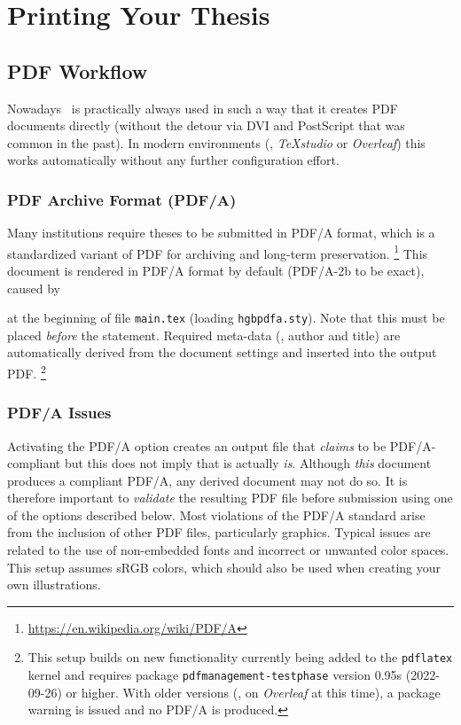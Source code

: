 \chapter{Printing Your Thesis}
\label{cha:Printing}


\section{PDF Workflow}
\label{sec:pdf-workflow}

Nowadays \latex\ is practically always used in such a way that it creates PDF
documents directly (without the detour via DVI and PostScript that was common
in the past). In modern environments (\eg, \emph{TeXstudio} or \emph{Overleaf})
this works automatically without any further configuration effort.


\subsection{PDF Archive Format (PDF/A)}
\label{sec:PDFA}

Many institutions require theses to be submitted in PDF/A format, which is a
standardized variant of PDF for archiving and long-term preservation.%
\footnote{\url{https://en.wikipedia.org/wiki/PDF/A}}
This document is rendered in PDF/A format by default (PDF/A-2b to be exact),
caused by
%
\begin{LaTeXCode}[numbers=none]
\RequirePackage{hgbpdfa}
\end{LaTeXCode}
%
at the beginning of file \verb!main.tex! (loading \verb!hgbpdfa.sty!).
Note that this must be placed \emph{before} the \verb!!
statement. Required meta-data (\eg, author and title) are automatically 
derived from the document settings and inserted into the output PDF.%
\footnote{This setup builds on new functionality currently being added to
the \texttt{pdflatex} kernel and requires package \texttt{pdfmanagement-testphase}
version 0.95s (2022-09-26) or higher. With older versions (\eg, on \emph{Overleaf}
at this time), a package warning is issued and no PDF/A is produced.}


\subsection{PDF/A Issues}
\label{sec:PDFA-issues}

Activating the PDF/A option creates an output file that \emph{claims} to be 
PDF/A-compliant but this does not imply that is actually \emph{is}.
Although \emph{this} document produces a compliant PDF/A, any derived document
may not do so. It is therefore important to \emph{validate} the resulting PDF file
before submission using one of the options described below. Most violations
of the PDF/A standard arise from the inclusion of other PDF files, particularly 
graphics. Typical issues are related to the use of non-embedded fonts
and incorrect or unwanted color spaces. This setup assumes sRGB colors, 
which should also be used when creating your own illustrations.

